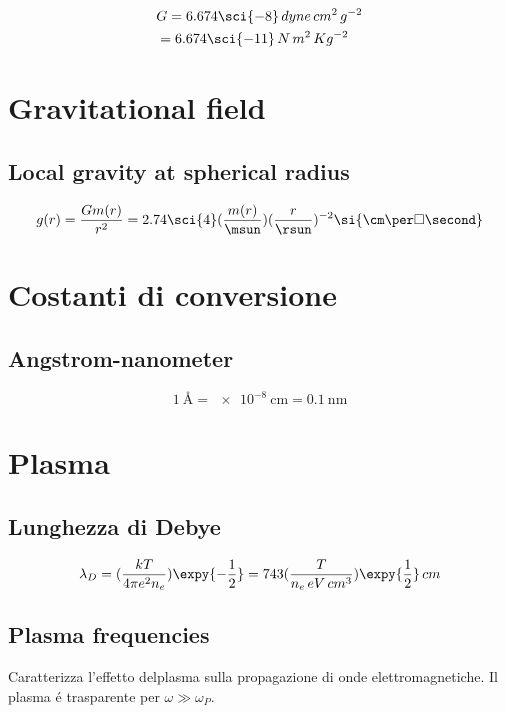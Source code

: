 \documentclass[oneside,12pt,fleqn]{memoir}
\begin{document}
\begin{align*}
&G=6.674\sci{-8}\,dyne\,cm^2\,g^{-2}\\
&=6.674\sci{-11}\,N\,m^2\,Kg^{-2}
\end{align*}


\section{Gravitational field}

\subsection{Local gravity at spherical radius}
\begin{equation*}
g(r)=\frac{Gm(r)}{r^2}=2.74\sci{4}(\frac{m(r)}{\msun})(\frac{r}{\rsun})^{-2}\si{\cm\per\square\second}
\end{equation*}


\section{Costanti di conversione}

\subsection{Angstrom-nanometer}
\begin{equation*}
\SI{1}{\angstrom}=\SI{e-8}{\cm}=\SI{0.1}{\nano\meter}
\end{equation*}

\section{Plasma}

\subsection{Lunghezza di Debye}

\begin{equation*}
\lambda_D=(\frac{kT}{4\pi e^2n_e})\expy{-\frac{1}{2}}=743(\frac{T}{n_e\,eV\,cm^3})\expy{\frac{1}{2}}\,cm
\end{equation*}

\subsection{Plasma frequencies}
Caratterizza l'effetto delplasma sulla propagazione di onde elettromagnetiche. Il plasma \'e trasparente per $\omega\gg\omega_P$.
\end{document}
